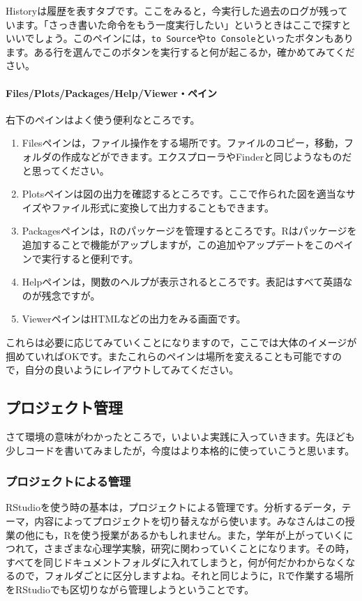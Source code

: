 \documentclass{ltjsbook}
\begin{document}
Historyは履歴を表すタブです。ここをみると，今実行した過去のログが残っています。「さっき書いた命令をもう一度実行したい」というときはここで探すといいでしょう。このペインには，\texttt{to Source}や\texttt{to Console}といったボタンもあります。ある行を選んでこのボタンを実行すると何が起こるか，確かめてみてください。
\paragraph{Files/Plots/Packages/Help/Viewer・ペイン}
右下のペインはよく使う便利なところです。
\begin{enumerate}
	\item Filesペインは，ファイル操作をする場所です。ファイルのコピー，移動，フォルダの作成などができます。エクスプローラやFinderと同じようなものだと思ってください。
	\item Plotsペインは図の出力を確認するところです。ここで作られた図を適当なサイズやファイル形式に変換して出力することもできます。
	\item Packagesペインは，Rのパッケージを管理するところです。Rはパッケージを追加することで機能がアップしますが，この追加やアップデートをこのペインで実行すると便利です。
	\item Helpペインは，関数のヘルプが表示されるところです。表記はすべて英語なのが残念ですが。
	\item ViewerペインはHTMLなどの出力をみる画面です。
\end{enumerate}
これらは必要に応じてみていくことになりますので，ここでは大体のイメージが掴めていればOKです。またこれらのペインは場所を変えることも可能ですので，自分の良いようにレイアウトしてみてください。

\subsection{プロジェクト管理}
さて環境の意味がわかったところで，いよいよ実践に入っていきます。先ほども少しコードを書いてみましたが，今度はより本格的に使っていこうと思います。
\subsubsection{プロジェクトによる管理}
\label{UnderProject}

RStudioを使う時の基本は，プロジェクトによる管理です。分析するデータ，テーマ，内容によってプロジェクトを切り替えながら使います。みなさんはこの授業の他にも，Rを使う授業があるかもしれません。また，学年が上がっていくにつれて，さまざまな心理学実験，研究に関わっていくことになります。その時，すべてを同じドキュメントフォルダに入れてしまうと，何が何だかわからなくなるので，フォルダごとに区分しますよね。それと同じように，Rで作業する場所をRStudioでも区切りながら管理しようということです。
\end{document}
